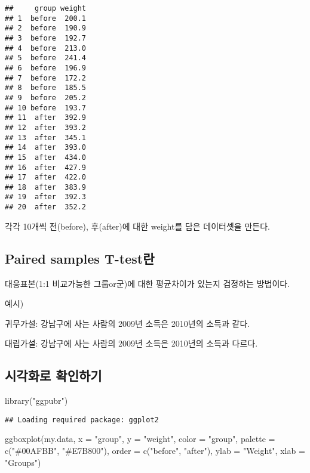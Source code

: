 \documentclass[
]{article}
\newenvironment{Shaded}{\begin{snugshade}}{\end{snugshade}}
\newcommand{\AttributeTok}[1]{\textcolor[rgb]{0.77,0.63,0.00}{#1}}
\newcommand{\FunctionTok}[1]{\textcolor[rgb]{0.00,0.00,0.00}{#1}}
\newcommand{\NormalTok}[1]{#1}
\newcommand{\StringTok}[1]{\textcolor[rgb]{0.31,0.60,0.02}{#1}}
\begin{document}
\begin{verbatim}
##     group weight
## 1  before  200.1
## 2  before  190.9
## 3  before  192.7
## 4  before  213.0
## 5  before  241.4
## 6  before  196.9
## 7  before  172.2
## 8  before  185.5
## 9  before  205.2
## 10 before  193.7
## 11  after  392.9
## 12  after  393.2
## 13  after  345.1
## 14  after  393.0
## 15  after  434.0
## 16  after  427.9
## 17  after  422.0
## 18  after  383.9
## 19  after  392.3
## 20  after  352.2
\end{verbatim}

각각 10개씩 전(before), 후(after)에 대한 weight를 담은 데이터셋을 만든다.

\hypertarget{paired-samples-t-testuxb780}{%
\subsection{Paired samples T-test란}\label{paired-samples-t-testuxb780}}

대응표본(1:1 비교가능한 그룹or군)에 대한 평균차이가 있는지 검정하는 방법이다.

예시)

귀무가설: 강남구에 사는 사람의 2009년 소득은 2010년의 소득과 같다.

대립가설: 강남구에 사는 사람의 2009년 소득은 2010년의 소득과 다르다.

\hypertarget{uxc2dcuxac01uxd654uxb85c-uxd655uxc778uxd558uxae30}{%
\subsection{시각화로 확인하기}\label{uxc2dcuxac01uxd654uxb85c-uxd655uxc778uxd558uxae30}}

\begin{Shaded}
\begin{Highlighting}[]
\FunctionTok{library}\NormalTok{(}\StringTok{"ggpubr"}\NormalTok{)}
\end{Highlighting}
\end{Shaded}

\begin{verbatim}
## Loading required package: ggplot2
\end{verbatim}

\begin{Shaded}
\begin{Highlighting}[]
\FunctionTok{ggboxplot}\NormalTok{(my.data, }
          \AttributeTok{x =} \StringTok{"group"}\NormalTok{,}
          \AttributeTok{y =} \StringTok{"weight"}\NormalTok{, }
          \AttributeTok{color =} \StringTok{"group"}\NormalTok{,}
          \AttributeTok{palette =} \FunctionTok{c}\NormalTok{(}\StringTok{"\#00AFBB"}\NormalTok{, }\StringTok{"\#E7B800"}\NormalTok{),}
          \AttributeTok{order =} \FunctionTok{c}\NormalTok{(}\StringTok{"before"}\NormalTok{, }\StringTok{"after"}\NormalTok{),}
          \AttributeTok{ylab =} \StringTok{"Weight"}\NormalTok{,}
          \AttributeTok{xlab =} \StringTok{"Groups"}\NormalTok{)}
\end{Highlighting}
\end{Shaded}
\end{document}
